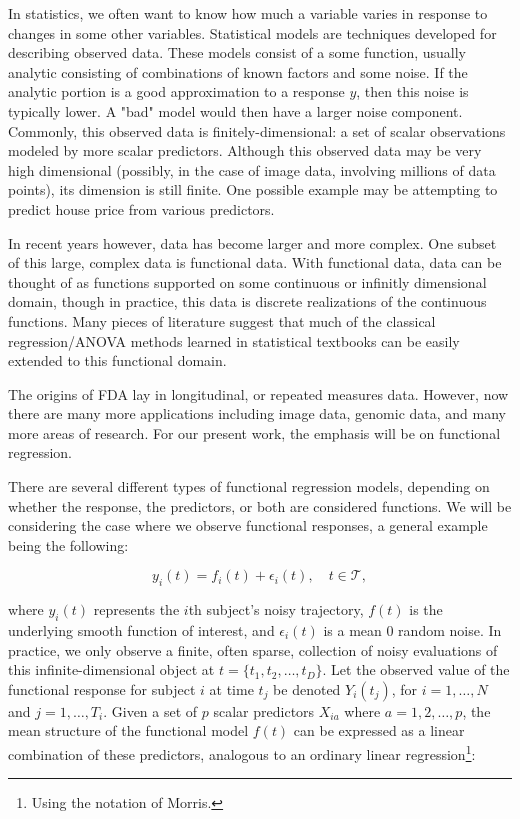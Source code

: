 In statistics, we often want to know how much a variable varies in response to changes in some other variables.  
Statistical models are techniques developed for describing observed data.  
These models consist of a some function, usually analytic consisting of combinations of known factors and some noise.  
If the analytic portion is a good approximation to a response \(y\), then this noise is typically lower.  
A "bad" model would then have a larger noise component.  
Commonly, this observed data is finitely-dimensional: a set of scalar observations modeled by more scalar predictors.  
Although this observed data may be very high dimensional (possibly, in the case of image data, involving millions of data points), its dimension is still finite.  
One possible example may be attempting to predict house price from various predictors\cite{de_cock_ames_2011}.

In recent years however, data has become larger and more complex.  
One subset of this large, complex data is functional data.  
With functional data, data can be thought of as functions supported on some continuous or infinitly dimensional domain, though in practice, this data is discrete realizations of the continuous functions.   
Many pieces of literature suggest that much of the classical regression/ANOVA methods learned in statistical textbooks can be easily extended to this functional domain.

The origins of FDA lay in longitudinal, or repeated measures data.  
However, now there are many more applications including image data, genomic data, and many more areas of research\cite{morris_functional_2015}.  For our present work, the emphasis will be on functional regression.  

There are several different types of functional regression models, depending on whether the response, the predictors, or both are considered functions.  
We will be considering the case where we observe functional responses, a general example being the following: 

\begin{equation}
    y_i(t) = f_i(t) + \epsilon_i(t), \quad t \in \mathcal{T},
\end{equation}

\noindent
where $y_i(t)$ represents the $i$th subject’s noisy trajectory, $f(t)$ is the underlying smooth function of interest, and \(\epsilon_i(t)\) is a mean 0 random noise.  
In practice, we only observe a finite, often sparse, collection of noisy evaluations of this infinite-dimensional object at \(t=\{t_1,t_2,\dots,t_D\}\).  
Let the observed value of the functional response for subject \(i\) at time \(t_j\) be denoted \(Y_i(t_j)\), for \(i = 1, \dots, N\) and \(j = 1, \dots, T_i\).  
Given a set of \(p\) scalar predictors \(X_{ia}\) where \( a = 1,2,\dots, p\), the mean structure of the functional model \(f(t)\) can be expressed as a linear combination of these predictors, analogous to an ordinary linear regression\footnote{Using the notation of Morris\cite{morris_functional_2015}.}:

